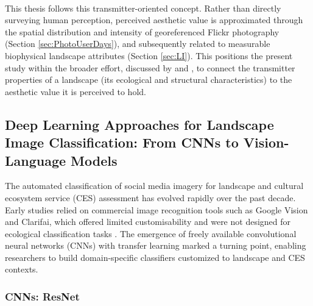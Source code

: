 \documentclass[hidelinks, 11pt]{article}
\begin{document}
\\
This thesis follows this transmitter-oriented concept. Rather than directly surveying human perception, perceived aesthetic value is approximated through the spatial distribution and intensity of georeferenced Flickr photography (Section \ref{sec:PhotoUserDays}), and subsequently related to measurable biophysical landscape attributes (Section \ref{sec:LI}). This positions the present study within the broader effort, discussed by \citep{tribot_integrating_2018} and \citep{ode_capturing_2008}, to connect the transmitter properties of a landscape (its ecological and structural characteristics) to the aesthetic value it is perceived to hold.

\subsection{Deep Learning Approaches for Landscape Image Classification: From CNNs to Vision-Language Models}
The automated classification of social media imagery for landscape and cultural ecosystem service (CES) assessment has evolved rapidly over the past decade. Early studies relied on commercial image recognition tools such as Google Vision and Clarifai, which offered limited customisability and were not designed for ecological classification tasks \citep{lingua_valuing_2022,winder_open-source_2022}. The emergence of freely available convolutional neural networks (CNNs) with transfer learning marked a turning point, enabling researchers to build domain-specific classifiers customized to landscape and CES contexts.

\subsubsection{CNNs: ResNet}
\end{document}
